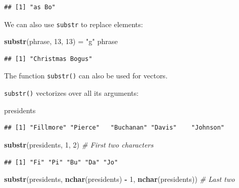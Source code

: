 \documentclass[
]{book}
\newenvironment{Shaded}{\begin{snugshade}}{\end{snugshade}}
\newcommand{\CommentTok}[1]{\textcolor[rgb]{0.56,0.35,0.01}{\textit{#1}}}
\newcommand{\DecValTok}[1]{\textcolor[rgb]{0.00,0.00,0.81}{#1}}
\newcommand{\KeywordTok}[1]{\textcolor[rgb]{0.13,0.29,0.53}{\textbf{#1}}}
\newcommand{\NormalTok}[1]{#1}
\newcommand{\OperatorTok}[1]{\textcolor[rgb]{0.81,0.36,0.00}{\textbf{#1}}}
\newcommand{\StringTok}[1]{\textcolor[rgb]{0.31,0.60,0.02}{#1}}
\begin{document}
\begin{verbatim}
## [1] "as Bo"
\end{verbatim}

We can also use \texttt{substr} to replace elements:

\begin{Shaded}
\begin{Highlighting}[]
\KeywordTok{substr}\NormalTok{(phrase, }\DecValTok{13}\NormalTok{, }\DecValTok{13}\NormalTok{) =}\StringTok{ "g"}
\NormalTok{phrase}
\end{Highlighting}
\end{Shaded}

\begin{verbatim}
## [1] "Christmas Bogus"
\end{verbatim}

The function \texttt{substr()} can also be used for vectors.

\texttt{substr()} vectorizes over all its arguments:

\begin{Shaded}
\begin{Highlighting}[]
\NormalTok{presidents}
\end{Highlighting}
\end{Shaded}

\begin{verbatim}
## [1] "Fillmore" "Pierce"   "Buchanan" "Davis"    "Johnson"
\end{verbatim}

\begin{Shaded}
\begin{Highlighting}[]
\KeywordTok{substr}\NormalTok{(presidents, }\DecValTok{1}\NormalTok{,}
    \DecValTok{2}\NormalTok{)  }\CommentTok{# First two characters}
\end{Highlighting}
\end{Shaded}

\begin{verbatim}
## [1] "Fi" "Pi" "Bu" "Da" "Jo"
\end{verbatim}

\begin{Shaded}
\begin{Highlighting}[]
\KeywordTok{substr}\NormalTok{(presidents, }\KeywordTok{nchar}\NormalTok{(presidents) }\OperatorTok{-}
\StringTok{    }\DecValTok{1}\NormalTok{, }\KeywordTok{nchar}\NormalTok{(presidents))  }\CommentTok{# Last two}
\end{Highlighting}
\end{Shaded}
\end{document}

